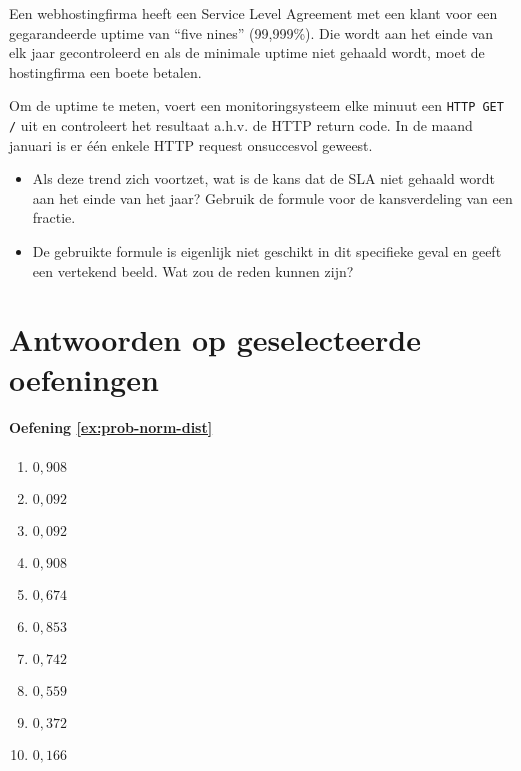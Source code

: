 \begin{exercise}
  Een webhostingfirma heeft een Service Level Agreement met een klant voor een gegarandeerde uptime van ``five nines'' (99,999\%).  Die wordt aan het einde van elk jaar gecontroleerd en als de minimale uptime niet gehaald wordt, moet de hostingfirma een boete betalen.

  Om de uptime te meten, voert een monitoringsysteem elke minuut een \texttt{HTTP GET /} uit en controleert het resultaat a.h.v.
  de HTTP return code. In de maand januari is er één enkele HTTP request onsuccesvol geweest.

  \begin{itemize}
    \item Als deze trend zich voortzet, wat is de kans dat de SLA niet gehaald wordt aan het einde van het jaar? Gebruik de formule voor de kansverdeling van een fractie.
    \item De gebruikte formule is eigenlijk niet geschikt in dit specifieke geval en geeft een vertekend beeld. Wat zou de reden kunnen zijn?
  \end{itemize}
\end{exercise}

\section{Antwoorden op geselecteerde oefeningen}
\label{sec:oplossingen-steekproefonderzoek}

\paragraph{Oefening \ref{ex:prob-norm-dist}}

\begin{enumerate}[label=\alph*.]
  \item $0,908$
  \item $0,092$
  \item $0,092$
  \item $0,908$
  \item $0,674$
  \item $0,853$
  \item $0,742$
  \item $0,559$
  \item $0,372$
  \item $0,166$
\end{enumerate}
